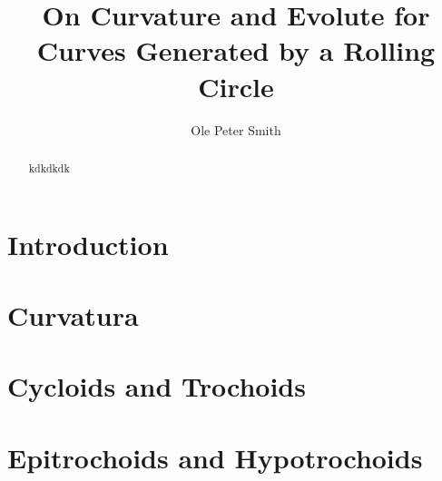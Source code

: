 \documentclass[a4paper,10pt]{article}
\title{On Curvature and Evolute for Curves Generated by a Rolling Circle}
\author{Ole Peter Smith}
\affil{IME, UFG}
\begin{document}
\maketitle

\begin{abstract}
 kdkdkdk
\end{abstract}

\section{Introduction}



\section{Curvatura}


%

\section{Cycloids and Trochoids}


\section{Epitrochoids and Hypotrochoids}

\end{document}
